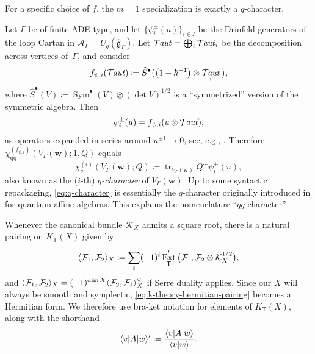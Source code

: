 \documentclass[10pt,a4paper]{amsart}
\numberwithin{equation}{section}
\renewcommand{\hat}[1]{\widehat{#1}}
\renewcommand{\vec}[1]{\bm{#1}}
\newcommand{\lie}[1]{\mathfrak{#1}}
\newcommand{\cF}{\mathcal{F}}
\newcommand{\cK}{\mathcal{K}}
\newcommand{\kQ}{Q}
\newcommand{\sT}{\mathsf{T}}
\newcommand{\scA}{\mathscr{A}}
\newcommand{\chiqq}{\chi_{\mathrm{qq}}}
\DeclareMathOperator{\Taut}{\mathcal{T}\mkern-1.5mu{\mathit{aut}}}
\DeclareMathOperator{\tr}{tr}
\DeclareMathOperator{\Sym}{Sym}
\DeclareMathOperator{\Ext}{Ext}
\DeclarePairedDelimiter{\inner}{\langle}{\rangle}
\begin{document}
\begin{MyParagraph}  For a specific choice of $f$, the $m=1$ specialization is exactly a $q$-character.
\begin{Example} \label{ex:q-character}
 Let $\Gamma$ be of finite ADE type, and let $\big\{\psi_i^\pm(u)\big\}_{i \in I}$
 be the Drinfeld generators of the loop Cartan in
 $\scA_\Gamma = U_q(\hat{\lie{g}}_\Gamma)$. Let $\Taut = \bigoplus_i \Taut_i$
 be the decomposition across vertices of~$\Gamma$, and consider
 \begin{equation} \label{eq:psi-geometric}
 f_{\psi,i}(\Taut) \coloneqq \hat S^\bullet\big(\big(1 - \hbar^{-1}\big) \otimes \Taut_i\big),
 \end{equation}
 where $\hat S^\bullet(V) \coloneqq \Sym^\bullet(V) \otimes (\det
 V)^{1/2}$ is a ``symmetrized'' version of the symmetric algebra.
 Then
 \begin{equation} \label{eq:psi-geometric-u}
 \psi_i^\pm(u) = f_{\psi,i}(u \otimes \Taut),
 \end{equation}
 as operators expanded in series around $u^{\pm 1} \to 0$, see, e.g.,
 \cite[Theorem~9.4.1]{Nakajima2001}. Therefore
 $\chiqq^{(f_{\psi,i})}(V_\Gamma(\vec w); 1, \kQ)$ equals
 \begin{equation} \label{eq:q-character}
 \chi_q^{(i)}(V_\Gamma(\vec w); \kQ) \coloneqq \tr_{V_\Gamma(\vec w)} Q^{\cdots} \psi_i^\pm(u),
 \end{equation}
 also known as the ($i$-th) {\it $q$-character} of $V_\Gamma(\vec w)$. Up
 to some syntactic repackaging, \eqref{eq:q-character} is essentially
 the $q$-character originally introduced in \cite{Frenkel1999} for
 quantum affine algebras. This explains the nomenclature
 ``$qq$-character''.
\end{Example}
\end{MyParagraph}

\begin{MyParagraph}
Whenever the canonical bundle $\cK_X$ admits a square root, there is a
natural pairing on $K_\sT(X)$ given by
\begin{equation} \label{eq:k-theory-hermitian-pairing}
 \inner{\cF_1, \cF_2}_X \coloneqq \sum_i (-1)^i \Ext^i_\sT\big(\cF_1, \cF_2 \otimes \cK_X^{1/2}\big),
\end{equation}
and
$\inner{\cF_1, \cF_2}_X = (-1)^{\dim X} \inner{\cF_2, \cF_1}_X^\vee$
if Serre duality applies. Since our $X$ will always be smooth and
symplectic, \eqref{eq:k-theory-hermitian-pairing} becomes a Hermitian
form. We therefore use bra-ket notation for elements of $K_\sT(X)$,
along with the shorthand
\[ \inner{v | A | w}' \coloneqq \frac{\inner{v | A | w}}{\inner{v | w}}. \]
\end{MyParagraph}
\end{document}
